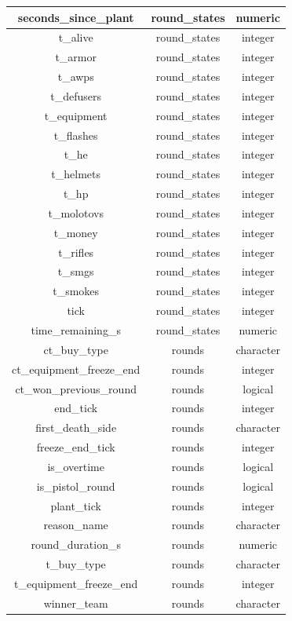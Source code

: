 \documentclass[twoside,11pt]{article}
\begin{document}
\begin{longtable}[c]{| c | c | c |}
  seconds\_since\_plant & round\_states & numeric\\\hline
  t\_alive & round\_states & integer\\\hline
  t\_armor & round\_states & integer\\\hline
  t\_awps & round\_states & integer\\\hline
  t\_defusers & round\_states & integer\\\hline
  t\_equipment & round\_states & integer\\\hline
  t\_flashes & round\_states & integer\\\hline
  t\_he & round\_states & integer\\\hline
  t\_helmets & round\_states & integer\\\hline
  t\_hp & round\_states & integer\\\hline
  t\_molotovs & round\_states & integer\\\hline
  t\_money & round\_states & integer\\\hline
  t\_rifles & round\_states & integer\\\hline
  t\_smgs & round\_states & integer\\\hline
  t\_smokes & round\_states & integer\\\hline
  tick & round\_states & integer\\\hline
  time\_remaining\_s & round\_states & numeric\\\hline
  ct\_buy\_type & rounds & character\\\hline
  ct\_equipment\_freeze\_end & rounds & integer\\\hline
  ct\_won\_previous\_round & rounds & logical\\\hline
  end\_tick & rounds & integer\\\hline
  first\_death\_side & rounds & character\\\hline
  freeze\_end\_tick & rounds & integer\\\hline
  is\_overtime & rounds & logical\\\hline
  is\_pistol\_round & rounds & logical\\\hline
  plant\_tick & rounds & integer\\\hline
  reason\_name & rounds & character\\\hline
  round\_duration\_s & rounds & numeric\\\hline
  t\_buy\_type & rounds & character\\\hline
  t\_equipment\_freeze\_end & rounds & integer\\\hline
  winner\_team & rounds & character\\\hline
\end{longtable}
\end{document}
